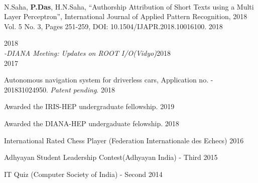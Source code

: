 \documentclass[10pt, letterpaper]{deps1}
\begin{document}
%
%
\vspace{-5pt}
\\
\vspace{-5pt}

%
%
\small{\begin{tightitemize}
    \item N.Saha, {\textbf{P.Das}}, H.N.Saha, ``Authorship Attribution of Short Texts using a Multi Layer Perceptron'', International Journal of Applied Pattern Recognition, 2018 Vol. 5 No. 3, Pages 251-259, DOI: 10.1504/IJAPR.2018.10016100. \hfill{2018}
\end{tightitemize}}

%
%
 \hfill{2018}\\
\hspace*{1ex}\hspace*{1ex}\hspace*{1ex}\hspace*{1ex}\hspace*{1ex}\hspace*{1ex}\hspace*{1ex}\hspace*{0.4ex}\textit{{\small {-DIANA Meeting: Updates on ROOT I/O(Vidyo)}}}\hfill{2018}\\
\hfill{2017}

%
%
\small{\begin{tightitemize}
    \item Autonomous navigation system for driverless cars, Application no. - 201831024950. {\textit{Patent pending}}. \hfill{2018}
\end{tightitemize}}

%
%
\begin{tightitemize}
    \item Awarded the IRIS-HEP undergraduate fellowship. \hfill{2019}
	\item Awarded the DIANA-HEP undergaduate felowship. \hfill{2018}
	\item International Rated Chess Player (Federation Internationale des Echecs) \hfill{2016}
	\item Adhyayan Student Leadership Contest(Adhyayan India) - Third \hfill{2015}
	\item IT Quiz (Computer Society of India) - Second \hfill{2014}
\end{tightitemize}
\end{document}
